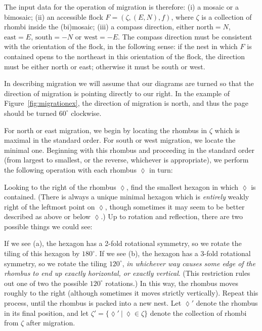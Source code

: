 \documentclass[12pt]{article}
\begin{document}
The input data for the operation of migration is therefore: (i) a
mosaic or a bimosaic; (ii) an accessible flock 
$F = (\zeta, (E,N), f)$, where $\zeta$ is a collection of rhombi
inside the (bi)mosaic; (iii)
a compass direction, either $\text{north}=N$, 
$\text{east}=E$, $\text{south}=-N$ or $\text{west}=-E$.  The compass
direction
must be consistent with the orientation of the flock, in the following
sense: if the nest in which $F$ is contained opens to the northeast
in this orientation of the flock, the direction must be either north 
or east; otherwise it must be south or west.

In describing migration we will assume that our diagrams are
turned so that the direction of migration is pointing directly
to our right.
In the example of Figure~\ref{fig:migrationex}, the 
direction of migration is north, and thus the page should be turned 
$60^\circ$ clockwise.

For north
or east migration, we begin by locating the rhombus in $\zeta$ which 
is maximal in the standard order.  For south or west migration, we 
locate the minimal one.
Beginning with this rhombus and proceeding in the standard order
(from largest to smallest, or the reverse, whichever is appropriate), 
we perform the following operation with each rhombus $\lozenge$ in 
turn:

Looking to the right of the rhombus $\lozenge$, find the smallest
hexagon in which $\lozenge$ is contained.  (There is always a unique 
minimal hexagon which is {\em entirely} weakly right of the leftmost point 
on $\lozenge$, though sometimes it may seem to be better described as 
above or below $\lozenge$.)
Up to rotation and reflection, 
there are two possible things we could see:
\begin{center}
\end{center}
If we see (a), the hexagon has a 2-fold rotational symmetry, so we 
rotate the tiling of this hexagon by $180^\circ$.
If we see (b), the hexagon has a 3-fold rotational symmetry, so we 
rotate the tiling 
$120^\circ$, {\em in whichever way causes some edge of the rhombus to end up
exactly horizontal, or exactly vertical}.  (This restriction rules out 
one of two the possible $120^\circ$ rotations.)  In this way, the rhombus
moves roughly to the right (although sometimes it moves strictly vertically).  
Repeat this process, until the rhombus is
packed into a new nest.  Let $\lozenge'$ denote the rhombus in its final 
position, and
let $\zeta' = \{\lozenge'\ |\ \lozenge \in \zeta\}$ denote the collection 
of rhombi from $\zeta$ after migration.
\end{document}
